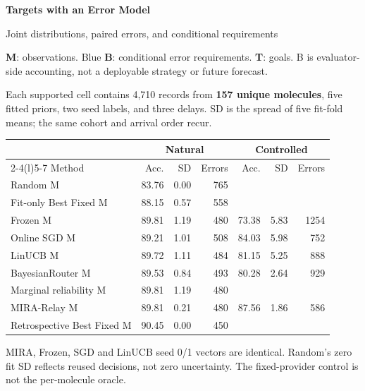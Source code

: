 \documentclass[10pt,letterpaper]{article}
\newcommand{\NA}{\textemdash}
\newcommand{\note}[1]{{\fontsize{8.5}{10.5}\selectfont #1\par}}
\newcommand{\sect}[1]{\vspace{5pt}{\large\bfseries #1}\par\vspace{2pt}}
\newenvironment{clean}{\begin{center}\fontsize{9.5}{11.5}\selectfont\setlength{\tabcolsep}{6pt}\renewcommand{\arraystretch}{1.06}}{\end{center}}
\begin{document}
{\LARGE\bfseries Targets with an Error Model}\par
{\large Joint distributions, paired errors, and conditional requirements}\par
\textbf{M}: observations. Blue \textbf{B}: conditional error requirements. \textbf{T}: goals.
B is evaluator-side accounting, not a deployable strategy or future forecast.

\sect{E1 / body Table 3: original-order comparison and spread}
Each supported cell contains 4,710 records from \textbf{157 unique molecules}, five fitted priors,
two seed labels, and three delays. SD is the spread of five fit-fold means; the same cohort and arrival order recur.
\par\noindent\begin{minipage}{\linewidth}\end{minipage}\par
\begin{clean}\begin{tabular}{@{}lrrrrrr@{}}
\toprule
& \multicolumn{3}{c}{Natural} & \multicolumn{3}{c}{Controlled} \\ \cmidrule(lr){2-4}\cmidrule(l){5-7} Method & Acc. & SD & Errors & Acc. & SD & Errors \\
\midrule
Random M & 83.76 & 0.00 & 765 & \NA & \NA & \NA \\
Fit-only Best Fixed M & 88.15 & 0.57 & 558 & \NA & \NA & \NA \\
Frozen M & 89.81 & 1.19 & 480 & 73.38 & 5.83 & 1254 \\
Online SGD M & 89.21 & 1.01 & 508 & 84.03 & 5.98 & 752 \\
LinUCB M & 89.72 & 1.11 & 484 & 81.15 & 5.25 & 888 \\
BayesianRouter M & 89.53 & 0.84 & 493 & 80.28 & 2.64 & 929 \\
Marginal reliability M & 89.81 & 1.19 & 480 & \NA & \NA & \NA \\
MIRA-Relay M & 89.81 & 0.21 & 480 & 87.56 & 1.86 & 586 \\
Retrospective Best Fixed M & 90.45 & 0.00 & 450 & \NA & \NA & \NA \\
\bottomrule\end{tabular}\end{clean}
\note{MIRA, Frozen, SGD and LinUCB seed 0/1 vectors are identical. Random's zero fit SD reflects reused decisions, not zero uncertainty. The fixed-provider control is not the per-molecule oracle.}
\end{document}
